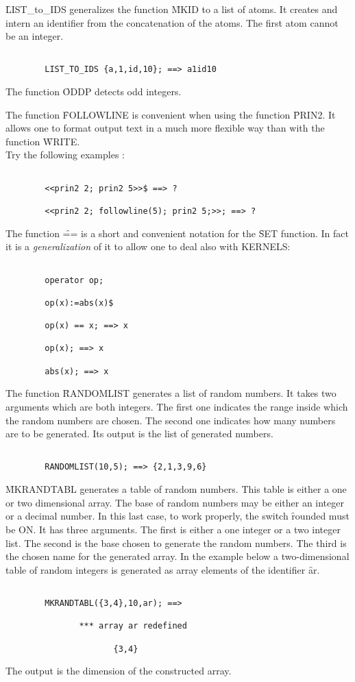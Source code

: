 \f{LIST\_to\_IDS} generalizes the function \f{MKID} to a list of
atoms. It creates and intern an identifier from the concatenation of
the atoms. The first atom cannot be an integer.
\begin{verbatim}

        LIST_TO_IDS {a,1,id,10}; ==> a1id10

\end{verbatim}
The function \f{ODDP}  detects odd integers.

The function \f{FOLLOWLINE} is convenient when using the function \f{PRIN2}.
It allows one to format output text in a much more flexible way than with
the function \f{WRITE}. \\
Try the following examples :
\begin{verbatim}

        <<prin2 2; prin2 5>>$ ==> ?

        <<prin2 2; followline(5); prin2 5;>>; ==> ?

\end{verbatim}
The function \f{==} is a short and convenient notation for the \f{SET}
function. In fact it is a {\em generalization} of it to allow one to
deal also with KERNELS:
\begin{verbatim}

        operator op;

        op(x):=abs(x)$

        op(x) == x; ==> x

        op(x); ==> x
        
        abs(x); ==> x

\end{verbatim}
The function \f{RANDOMLIST} generates a list of random numbers. It takes
two arguments which are both integers. The first one indicates the range
inside which the random numbers are chosen. The second one indicates how
many numbers are to be generated. Its output is the list of 
generated numbers.
\begin{verbatim}

        RANDOMLIST(10,5); ==> {2,1,3,9,6}

\end{verbatim}
\f{MKRANDTABL} generates a table of random numbers. This table is either
a one or two dimensional array. The base of random numbers may be either
an integer or a decimal number. In this last case, to work properly,
the switch \f{rounded} must be ON. It has three arguments. The first is
either a one integer or a two integer list. The second is the base chosen
to generate the random numbers. The third is the chosen name for the
generated array. In the example below a two-dimensional table of
random integers is generated as array elements of the identifier {\f ar}.
\begin{verbatim}

        MKRANDTABL({3,4},10,ar); ==>

               *** array ar redefined

                      {3,4}

\end{verbatim}
The output is the dimension of the constructed array.

